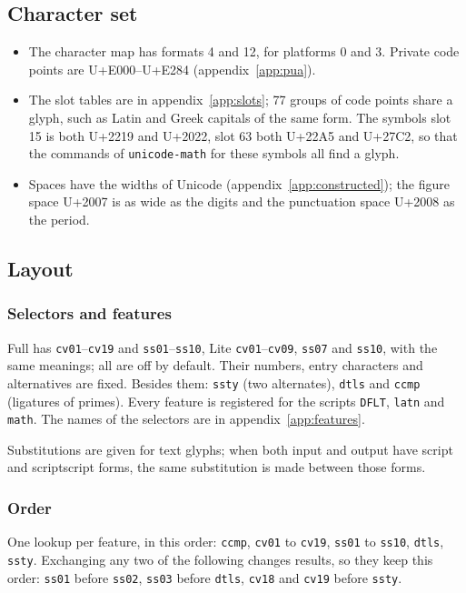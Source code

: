 \documentclass[10pt]{article}
\newcommand\code[1]{\texttt{#1}}
\newcommand\feat[1]{\texttt{#1}}
\newcommand\U[1]{U+#1}
\begin{document}
\subsection{Character set}

\begin{itemize}
\item The character map has formats 4 and 12, for platforms 0 and 3.
  Private code points are \U{E000}--\U{E284}
  (appendix~\ref{app:pua}).
\item The slot tables are in appendix~\ref{app:slots}; 77 groups of code
  points share a glyph, such as Latin and Greek capitals of the same
  form.  The symbols slot 15 is both \U{2219} and \U{2022}, slot 63
  both \U{22A5} and \U{27C2}, so that the commands of
  \code{unicode-math} for these symbols all find a glyph.
\item Spaces have the widths of Unicode
  (appendix~\ref{app:constructed}); the figure space \U{2007} is as wide
  as the digits and the punctuation space \U{2008} as the period.
\end{itemize}

\subsection{Layout}\label{app:layout}

\subsubsection{Selectors and features}

Full has \feat{cv01}--\feat{cv19} and \feat{ss01}--\feat{ss10}, Lite
\feat{cv01}--\feat{cv09}, \feat{ss07} and \feat{ss10}, with the same
meanings; all are off by default.  Their numbers, entry characters and
alternatives are fixed.  Besides them: \feat{ssty} (two alternates),
\feat{dtls} and \feat{ccmp} (ligatures of primes).  Every feature is
registered for the scripts \code{DFLT}, \code{latn} and \code{math}.
The names of the selectors are in appendix~\ref{app:features}.

Substitutions are given for text glyphs; when both input and output
have script and scriptscript forms, the same substitution is made
between those forms.

\subsubsection{Order}

One lookup per feature, in this order: \feat{ccmp}, \feat{cv01} to
\feat{cv19}, \feat{ss01} to \feat{ss10}, \feat{dtls}, \feat{ssty}.
Exchanging any two of the following changes results, so they keep this
order: \feat{ss01} before \feat{ss02}, \feat{ss03} before \feat{dtls},
\feat{cv18} and \feat{cv19} before \feat{ssty}.
\end{document}
